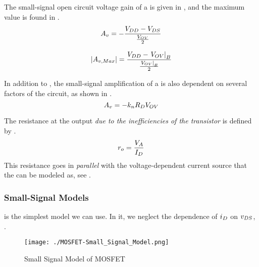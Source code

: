 The small-signal open circuit voltage gain of a  is given in , and the maximum value is found in .
\begin{equation}\label{eq:MOSFET-Small_Signal_Voltage_Gain}
  \Amp{\Voltage} = -\frac{\DCVoltage{DD} - \DCVoltage{DS}}{\frac{\OverdriveVoltage}{2}}
\end{equation}

\begin{equation}\label{eq:MOSFET-Small_Signal_Voltage_Gain-Max}
  \Abs{\Amp{\Voltage,Max}} = \frac{\DCVoltage{DD} - \left. \OverdriveVoltage \right\rvert_{\MaxBiasPoint}}{\frac{\left. \OverdriveVoltage \right\rvert_{\MaxBiasPoint}}{2}}
\end{equation}

In addition to , the small-signal amplification of a  is also dependent on several factors of the circuit, as shown in .
\begin{equation}\label{eq:MOSFET-Small_Signal_Voltage_Gain-Overdrive_Voltage}
  A_{v} = -k_{n} R_{D} V_{OV}
\end{equation}

The resistance at the output \emph{due to the inefficiencies of the transistor} is defined by .
\begin{equation}\label{eq:MOSFET-Transistor_Resistance}
  \ChannelModResist = \frac{\DCVoltage{A}}{\DCCurrent{\Drain}}
\end{equation}
This resistance goes in \emph{parallel} with the voltage-dependent current source that the  can be modeled as, see .

\subsubsection{Small-Signal Models}\label{subsubsec:MOSFET-Small_Signal_Models}
 is the simplest model we can use.
In it, we neglect the dependence of $\ACCurrent{\Drain}$ on $\ACVoltage{\Drain\Source}$, .

\begin{figure}[h!tbp]
  \centering
  \texttt{[image: ./MOSFET-Small\_Signal\_Model.png]}
  \caption{Small Signal Model of MOSFET \parencite[p.~387]{sedraTextbook7}}
  \label{fig:MOSFET-Small_Signal_Model}
\end{figure}

